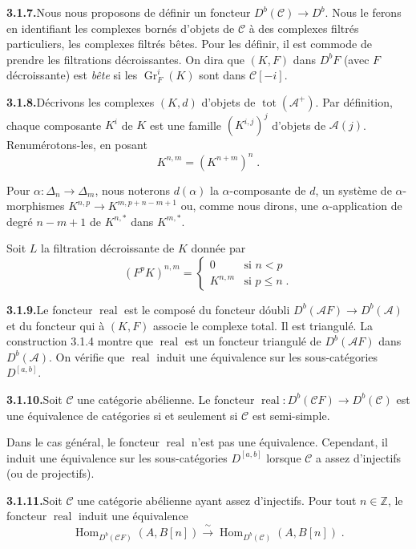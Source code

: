 \documentclass[12pt,a4paper]{article}
\theoremstyle{plain}
\theoremstyle{definition}
\DeclareMathOperator{\Hom}{Hom}
\DeclareMathOperator{\real}{real}
\DeclareMathOperator{\Gr}{Gr}
\DeclareMathOperator{\tot}{tot}
\begin{document}
\smallskip
\noindent\textbf{3.1.7.}\quad Nous nous proposons de d\'efinir un foncteur $D^b(\mathcal{C}) \to D^b$. Nous le ferons en identifiant les complexes born\'es d'objets de $\mathcal{C}$ \`a des complexes filtr\'es particuliers, les complexes filtr\'es b\^etes. Pour les d\'efinir, il est commode de prendre les filtrations d\'ecroissantes. On dira que $(K, F)$ dans $D^bF$ (avec $F$ d\'ecroissante) est \emph{b\^ete} si les $\Gr_F^i(K)$ sont dans $\mathcal{C}[-i]$.

\smallskip
\noindent\textbf{3.1.8.}\quad D\'ecrivons les complexes $(K, d)$ d'objets de $\tot(\mathcal{A}^+)$. Par d\'efinition, chaque composante $K^i$ de $K$ est une famille $(K^{i,j})^j$ d'objets de $\mathcal{A}(j)$. Renum\'erotons-les, en posant
\[
K^{n,m} = (K^{n+m})^n\;.
\]

Pour $\alpha : \Delta_n \to \Delta_m$, nous noterons $d(\alpha)$ la $\alpha$-composante de $d$, un syst\`eme de $\alpha$-morphismes $K^{n,p} \to K^{m, p+n-m+1}$ ou, comme nous dirons, une $\alpha$-application de degr\'e $n-m+1$ de $K^{n,*}$ dans $K^{m,*}$.

Soit $L$ la filtration d\'ecroissante de $K$ donn\'ee par
\[
(F^p K)^{n,m} = \begin{cases} 0 & \text{si } n < p \\ K^{n,m} & \text{si } p \leqslant n\;. \end{cases}
\]

\smallskip
\noindent\textbf{3.1.9.}\quad Le foncteur $\real$ est le compos\'e du foncteur d\'oubli $D^b(\mathcal{A}F) \to D^b(\mathcal{A})$ et du foncteur qui \`a $(K, F)$ associe le complexe total. Il est triangul\'e. La construction 3.1.4 montre que $\real$ est un foncteur triangul\'e de $D^b(\mathcal{A}F)$ dans $D^b(\mathcal{A})$. On v\'erifie que $\real$ induit une \'equivalence sur les sous-cat\'egories $D^{[a,b]}$.

\smallskip
\noindent\textbf{3.1.10.}\quad Soit $\mathcal{C}$ une cat\'egorie ab\'elienne. Le foncteur $\real : D^b(\mathcal{C}F) \to D^b(\mathcal{C})$ est une \'equivalence de cat\'egories si et seulement si $\mathcal{C}$ est semi-simple.

Dans le cas g\'en\'eral, le foncteur $\real$ n'est pas une \'equivalence. Cependant, il induit une \'equivalence sur les sous-cat\'egories $D^{[a,b]}$ lorsque $\mathcal{C}$ a assez d'injectifs (ou de projectifs).

\smallskip
\noindent\textbf{3.1.11.}\quad Soit $\mathcal{C}$ une cat\'egorie ab\'elienne ayant assez d'injectifs. Pour tout $n \in \mathbb{Z}$, le foncteur $\real$ induit une \'equivalence
\[
\Hom_{D^b(\mathcal{C}F)}(A, B[n]) \xrightarrow{\;\sim\;} \Hom_{D^b(\mathcal{C})}(A, B[n])\;.
\]
\end{document}
